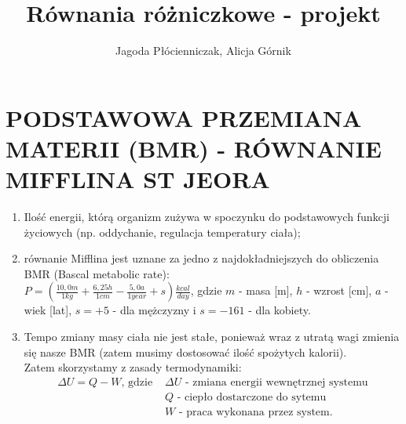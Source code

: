 \documentclass{article}
\title{Równania różniczkowe - projekt}
\author{Jagoda Płócienniczak, Alicja Górnik}
\newcounter{mojlicznik}  %
\begin{document}
\setcounter{mojlicznik}{1}  %
\maketitle
\section*{PODSTAWOWA PRZEMIANA MATERII (BMR) - RÓWNANIE MIFFLINA ST JEORA}

\begin{enumerate}
    \item Ilość energii, którą organizm zużywa w spoczynku do podstawowych funkcji życiowych (np. oddychanie, regulacja temperatury ciała);
    \item równanie Mifflina jest uznane za jedno z najdokładniejszych do obliczenia BMR (Bascal metabolic rate): \\
    $ P = \left( \frac{10,0 m}{1 kg} + \frac{6,25 h}{1 cm} - \frac{5,0 a}{1 year} + s \right) \frac{kcal}{day}$, gdzie $m$ - masa [m], $h$ - wzrost [cm], $a$ - wiek [lat], $s = +5$ - dla mężczyzny i $s = -161$ - dla kobiety.
    \item Tempo zmiany masy ciała nie jest stałe, ponieważ wraz z utratą wagi zmienia się nasze BMR (zatem musimy dostosować ilość spożytych kalorii).\\
    Zatem skorzystamy z  zasady termodynamiki:
	 \begin{align*}
    \Delta U = Q - W \text{, gdzie } &\Delta U \text{ - zmiana energii wewnętrznej systemu}\\
    	&Q\text{ - ciepło dostarczone do sytemu}\\
    	&W\text{ - praca wykonana przez system.}
	\end{align*}


\end{enumerate}
\end{document}
